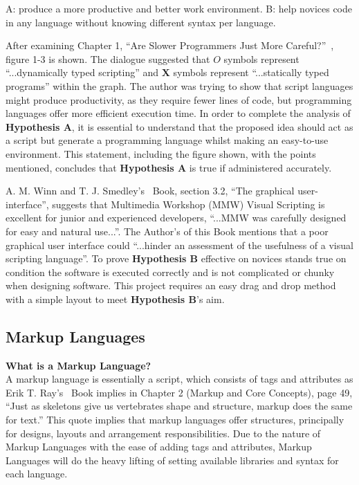\documentclass[conference]{IEEEtran}
\begin{document}
        \begin{center}
           A: produce a more productive and better work environment.
           B: help novices code in any language without knowing different syntax per language.
        \end{center}
        
        After examining Chapter 1, ``Are Slower Programmers Just More Careful?''~\cite{dr_caitlin_sadowski_rethinking_2019}, figure 1-3 is shown. The dialogue suggested that $O$ symbols represent ``...dynamically typed scripting'' and $\mathbf{X}$ symbols represent ``...statically typed programs'' within the graph. The author was trying to show that script languages might produce productivity, as they require fewer lines of code, but programming languages offer more efficient execution time. In order to complete the analysis of \textbf{Hypothesis A}, it is essential to understand that the proposed idea should act as a script but generate a programming language whilst making an easy-to-use environment. This statement, including the figure shown, with the points mentioned, concludes that \textbf{Hypothesis A} is true if administered accurately.

        A. M. Winn and T. J. Smedley’s~\cite{winn_multimedia_1998} Book, section 3.2, ``The graphical user-interface'',  suggests that Multimedia Workshop (MMW) Visual Scripting is excellent for junior and experienced developers, ``...MMW was carefully designed for easy and natural use...''. The Author’s of this Book mentions that a poor graphical user interface could ``...hinder an assessment of the usefulness of a visual scripting language''. To prove \textbf{Hypothesis B} effective on novices stands true on condition the software is executed correctly and is not complicated or chunky when designing software. This project requires an easy drag and drop method with a simple layout to meet \textbf{Hypothesis B}’s aim.

      \subsection{Markup Languages}
      \label{subsec:lr-markupLanguages}
        \textbf{What is a Markup Language?}\\
        A markup language is essentially a script, which consists of tags and attributes as Erik T. Ray's~\cite{ray_learning_nodate} Book implies in Chapter 2 (Markup and Core Concepts), page 49, ``Just as skeletons give us vertebrates shape and structure, markup does the same for text.'' This quote implies that markup languages offer structures, principally for designs, layouts and arrangement responsibilities. Due to the nature of Markup Languages with the ease of adding tags and attributes, Markup Languages will do the heavy lifting of setting available libraries and syntax for each language.
\end{document}
